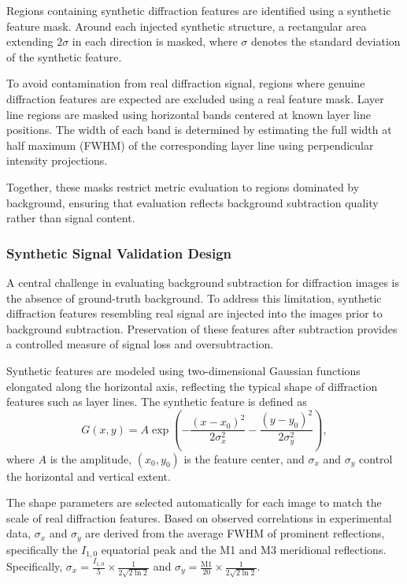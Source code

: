 \documentclass[iucr,review]{iucrjournals}
\begin{document}
Regions containing synthetic diffraction features are identified using a synthetic feature mask. Around each injected synthetic structure, a rectangular area extending $2\sigma$ in each direction is masked, where $\sigma$ denotes the standard deviation of the synthetic feature.

To avoid contamination from real diffraction signal, regions where genuine diffraction features are expected are excluded using a real feature mask. Layer line regions are masked using horizontal bands centered at known layer line positions. The width of each band is determined by estimating the full width at half maximum (FWHM) of the corresponding layer line using perpendicular intensity projections.

Together, these masks restrict metric evaluation to regions dominated by background, ensuring that evaluation reflects background subtraction quality rather than signal content.

\subsubsection{Synthetic Signal Validation Design}

A central challenge in evaluating background subtraction for diffraction images is the absence of ground-truth background. To address this limitation, synthetic diffraction features resembling real signal are injected into the images prior to background subtraction. Preservation of these features after subtraction provides a controlled measure of signal loss and oversubtraction.

Synthetic features are modeled using two-dimensional Gaussian functions elongated along the horizontal axis, reflecting the typical shape of diffraction features such as layer lines. The synthetic feature is defined as
\begin{equation}
G(x, y) = A \exp\!\left(
-\frac{(x-x_0)^2}{2\sigma_x^2}
-\frac{(y-y_0)^2}{2\sigma_y^2}
\right),
\end{equation}
where $A$ is the amplitude, $(x_0, y_0)$ is the feature center, and $\sigma_x$ and $\sigma_y$ control the horizontal and vertical extent.

The shape parameters are selected automatically for each image to match the scale of real diffraction features. Based on observed correlations in experimental data, $\sigma_x$ and $\sigma_y$ are derived from the average FWHM of prominent reflections, specifically the $I_{1,0}$ equatorial peak and the M1 and M3 meridional reflections. Specifically, $\sigma_x = \frac{I_{1,0}}{5} \times \frac{1}{2\sqrt{2\ln2}}$ and $\sigma_y = \frac{\mathrm{M1}}{20} \times \frac{1}{2\sqrt{2\ln2}}$.
\end{document}
